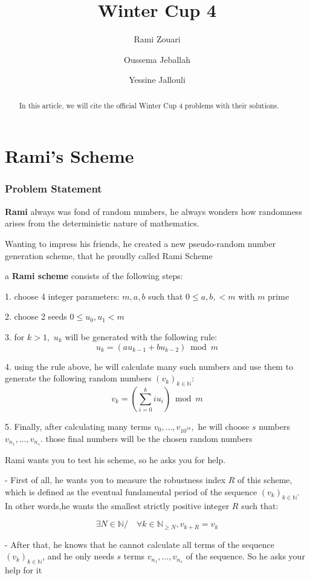 \documentclass[]{article}
\title{Winter Cup 4}
\author{Rami Zouari
\and 
Oussema Jeballah
\and
Yessine Jallouli}
\begin{document}
\maketitle

\begin{abstract}
In this article, we will cite the official Winter Cup 4 problems with their solutions.
\end{abstract}
\tableofcontents

\pagebreak
\part{Rami's Scheme}
\section{Problem Statement}
\textbf{Rami}  always was fond of random numbers, he always wonders how randomness arises from the deterministic nature of mathematics.

Wanting to impress his friends, he created a new pseudo-random number generation scheme, that he proudly called Rami Scheme

a \textbf{Rami scheme} consists of the following steps:

1. choose 4 integer parameters: $m,a,b$  such that $0\leq a,b,<m$  with $m$ prime 

2. choose 2 seeds $0\leq u_0,u_1 <m$ 

3. for $k>1,$ $u_k$ will be generated with the following rule:
$$
u_k=(au_{k-1}+bu_{k-2})\bmod m
$$

4. using the rule above, he will calculate many such numbers and use them to generate the following random numbers $(v_k)_{k\in\mathbb{N}}$:
$$
v_k=\left(\sum_{i=0}^kiu_i\right)\bmod m
$$

5. Finally, after calculating many terms $v_0,\dots,v_{10^{18}},$ he will choose $s$ numbers $v_{n_1},\dots,v_{n_s}.$ those final numbers will be the chosen random numbers  


Rami wants you to test his scheme, so he asks you for help.

- First of all, he wants you to measure the robustness index $R$  of this scheme, which is defined as the eventual fundamental period of the sequence $(v_k)_{k\in\mathbb{N}}.$ In other words,he wants the smallest strictly positive integer $R$ such that:

$$
\exists N\in\mathbb{N}/\quad\forall k\in\mathbb{N}_{\ge N}, v_{k+R}=v_k
$$


- After that, he knows that he cannot calculate all terms of the sequence $(v_k)_{k\in\mathbb{N}}$, and he only needs $s$ terms $v_{n_1},\dots,v_{n_s}$ of the sequence. So he asks your help for it
\end{document}
